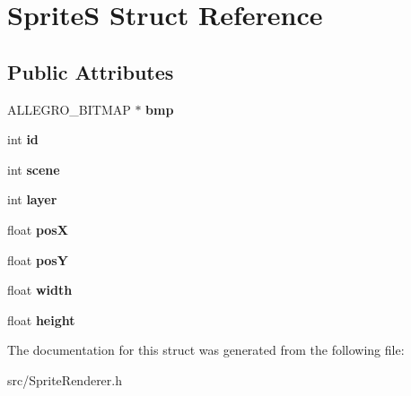 \hypertarget{struct_sprite_s}{}\section{SpriteS Struct Reference}
\label{struct_sprite_s}
\subsection*{Public Attributes}
\begin{DoxyCompactItemize}
\item 
\mbox{\label{struct_sprite_s_a9c707ef49fb484923b756f1d10ef6af9}} 
A\+L\+L\+E\+G\+R\+O\+\_\+\+B\+I\+T\+M\+AP $\ast$ {\bfseries bmp}
\item 
\mbox{\label{struct_sprite_s_a345ce1510ab69c0ad8c90fa1ae2bca21}} 
int {\bfseries id}
\item 
\mbox{\label{struct_sprite_s_a5a1923ed70d01fcc045ed1f976e233f5}} 
int {\bfseries scene}
\item 
\mbox{\label{struct_sprite_s_a06ac51d1cad5c0048e2c8af2c6b55371}} 
int {\bfseries layer}
\item 
\mbox{\label{struct_sprite_s_ab5034c60710a5b4d78c0ca5d8df4d010}} 
float {\bfseries posX}
\item 
\mbox{\label{struct_sprite_s_abfecc96372122a47f45b2843d65fa63f}} 
float {\bfseries posY}
\item 
\mbox{\label{struct_sprite_s_a5c2f062d7bfebc2dd3239838aeab4150}} 
float {\bfseries width}
\item 
\mbox{\label{struct_sprite_s_abe7bf9022026c10fe3914e8665e58bab}} 
float {\bfseries height}
\end{DoxyCompactItemize}


The documentation for this struct was generated from the following file\+:\begin{DoxyCompactItemize}
\item 
src/Sprite\+Renderer.\+h\end{DoxyCompactItemize}
